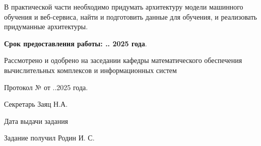 \documentclass[bachelor, och, assignment, times, article]{../Include/SCWorks}
\begin{document}
В практической части необходимо придумать архитектуру модели машинного обучения и веб-сервиса, найти и подготовить данные для обучения, и реализовать придуманные архитектуры. 

\textbf{Срок предоставления работы:   \underline{\hspace{1.00cm}}.\underline{\hspace{1.25cm}}. 2025 года}.
                                                    
Рассмотрено и одобрено на заседании кафедры математического обеспечения вычислительных комплексов и информационных систем

Протокол № \underline{\hspace{1.00cm}}  от  \underline{\hspace{0.75cm}}.\underline{\hspace{1.00cm}}.2025 года. 

Секретарь  \underline{\hspace{4.00cm}}Заяц Н.А.

Дата выдачи задания  \underline{\hspace{4.00cm}}

Задание получил  \underline{\hspace{4.00cm}} Родин И. С.
\end{document}
